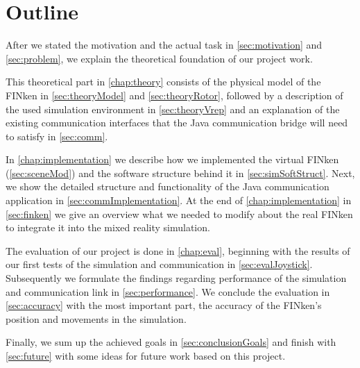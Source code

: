          
\section{Outline}
    After we stated the motivation and the actual task in \ref{sec:motivation} and \ref{sec:problem}, we explain the theoretical foundation of our project work.
    
    This theoretical part in \ref{chap:theory} consists of the physical model of the FINken in \ref{sec:theoryModel} and \ref{sec:theoryRotor}, followed by a description of the used simulation environment in \ref{sec:theoryVrep} and an explanation of the existing communication interfaces that the Java communication bridge will need to satisfy in \ref{sec:comm}.
    
    In \ref{chap:implementation} we describe how we implemented the virtual FINken (\ref{sec:sceneMod}) and the software structure behind it in \ref{sec:simSoftStruct}. 
    Next, we show the detailed structure and functionality of the Java communication application in \ref{sec:commImplementation}.
    At the end of \ref{chap:implementation} in \ref{sec:finken} we give an overview  what we needed to modify about the real FINken to integrate it into the mixed reality simulation.
    
    The evaluation of our project is done in \ref{chap:eval}, beginning with the results of our first tests of the simulation and communication in \ref{sec:evalJoystick}.
    Subsequently we formulate the findings regarding performance of the simulation and communication link in \ref{sec:performance}.
    We conclude the evaluation in \ref{sec:accuracy} with the most important part, the accuracy of the FINken's position and movements in the simulation.
    
    Finally, we sum up the achieved goals in \ref{sec:conclusionGoals} and finish with \ref{sec:future} with some ideas for future work based on this project. 
    
